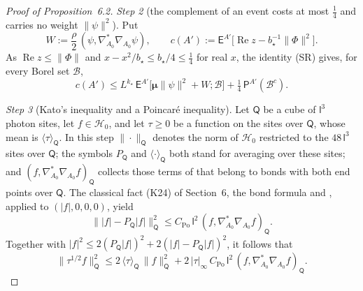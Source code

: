 \documentclass[11pt]{amsart}
\theoremstyle{definition}
\begin{document}
\begin{proof}[Proof of Proposition~6.2]
\emph{Step 2} (the complement of an event costs at most $\frac14$ and carries no weight $\|\psi\|^2$).
Put
\begin{equation*}
W:=\frac\rho2\,(\psi,\nabla^*_{A_0}\nabla_{A_0}\psi),\qquad c(A'):=\mathsf E^{A'}\bigl[\operatorname{Re}z-b_\star^{-1}\|\Phi\|^2\bigr].
\end{equation*}
As $\operatorname{Re}z\le\|\Phi\|$ and $x-x^2/b_\star\le b_\star/4\le\frac14$ for real $x$, the identity (SR) gives, for every Borel set $\mathcal B$,
\begin{equation*}
c(A')\le L^{k_\star}\,\mathsf E^{A'}\bigl[\boldsymbol\mu\|\psi\|^2+W;\mathcal B\bigr]+\tfrac14\,\mathsf P^{A'}(\mathcal B^c).
\end{equation*}

\emph{Step 3} (Kato's inequality and a Poincar\'e inequality).
Let $\mathsf Q$ be a cube of $\mathsf l^3$ photon sites, let $f\in\mathcal H_0$, and let $\tau\ge0$ be a function on the sites over $\mathsf Q$, whose mean is $\langle\tau\rangle_{\mathsf Q}$.
In this step $\|\cdot\|_{\mathsf Q}$ denotes the norm of $\mathcal H_0$ restricted to the $48\,\mathsf l^3$ sites over $\mathsf Q$;
the symbols $P_{\mathsf Q}$ and $\langle\cdot\rangle_{\mathsf Q}$ both stand for averaging over these sites;
and $(f,\nabla^*_{A_0}\nabla_{A_0}f)_{\mathsf Q}$ collects those terms of \cite[(I.O2)]{QEDIII} that belong to bonds with both end points over $\mathsf Q$.
The classical fact (K24) of Section~6, the bond formula \cite[(I.O2)]{QEDIII} and \cite[Proposition~1.4]{QEDIII}, applied to $(|f|,0,0,0)$, yield
\begin{equation*}
\bigl\||f|-P_{\mathsf Q}|f|\bigr\|^2_{\mathsf Q}\le C_{\mathrm{Po}}\,\mathsf l^2\,(f,\nabla^*_{A_0}\nabla_{A_0}f)_{\mathsf Q}.
\end{equation*}
Together with $|f|^2\le2(P_{\mathsf Q}|f|)^2+2(|f|-P_{\mathsf Q}|f|)^2$, it follows that
\begin{equation*}
\|\tau^{1/2}f\|^2_{\mathsf Q}\le2\,\langle\tau\rangle_{\mathsf Q}\,\|f\|^2_{\mathsf Q}+2\,|\tau|_\infty\,C_{\mathrm{Po}}\,\mathsf l^2\,(f,\nabla^*_{A_0}\nabla_{A_0}f)_{\mathsf Q}.
\end{equation*}


\end{proof}
\end{document}
